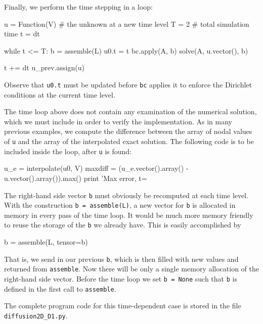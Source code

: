 Finally, we perform the time stepping in a loop:
\begin{python}
u = Function(V)   # the unknown at a new time level
T = 2             # total simulation time
t = dt

while t <= T:
    b = assemble(L)
    u0.t = t
    bc.apply(A, b)
    solve(A, u.vector(), b)

    t += dt
    u_prev.assign(u)
\end{python}
Observe that {\fontsize{10pt}{10pt}\verb!u0.t!} must be updated before {\fontsize{10pt}{10pt}\texttt{bc}} applies
it to enforce the Dirichlet conditions at the current time level.

The time loop above does not contain any examination of the numerical
solution, which we must include in order to verify the implementation.
As in many previous examples, we compute the difference between
the array of nodal
values of {\fontsize{10pt}{10pt}\texttt{u}} and the array of the interpolated exact solution.
The following code is to be included inside the loop, after {\fontsize{10pt}{10pt}\texttt{u}}
is found:
\begin{python}
    u_e = interpolate(u0, V)
    maxdiff = (u_e.vector().array() - u.vector().array()).max()
    print 'Max error, t=%
\end{python}

The right-hand side vector {\fontsize{10pt}{10pt}\texttt{b}} must obviously 
be recomputed at each time level.
With the construction {\fontsize{10pt}{10pt}\texttt{b = assemble(L)}}, a new
vector for {\fontsize{10pt}{10pt}\texttt{b}} is allocated in memory in every pass of the time loop.
It would be much more memory friendly to reuse the storage of the {\fontsize{10pt}{10pt}\texttt{b}}
we already have.
This is easily accomplished by
\begin{python}
    b = assemble(L, tensor=b)
\end{python}
That is, we send in our previous {\fontsize{10pt}{10pt}\texttt{b}}, which is then filled with new values
and returned from {\fontsize{10pt}{10pt}\texttt{assemble}}. Now there will be only a single
memory allocation of the right-hand side vector. Before the time loop
we set {\fontsize{10pt}{10pt}\texttt{b = None}} such that {\fontsize{10pt}{10pt}\texttt{b}} is defined in the first call to
{\fontsize{10pt}{10pt}\texttt{assemble}}.

The complete program code for this time-dependent case is stored in
the file {\fontsize{10pt}{10pt}\verb!diffusion2D_D1.py!}.

